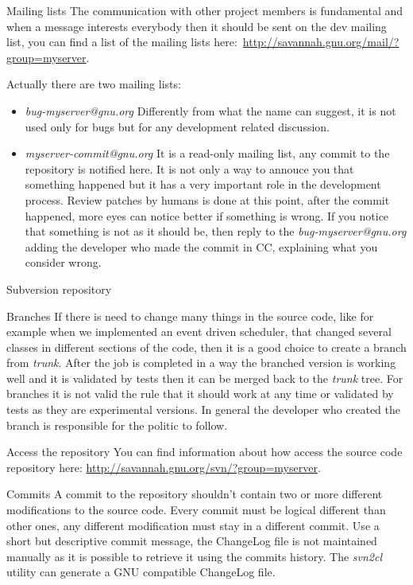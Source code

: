 \documentclass[12pt]{article}
\begin{document}
\begin{section}{Mailing lists}\label{section:ml}
The communication with other project members is fundamental and when a
message interests everybody then it should be sent on the dev mailing
list, you can find a list of the mailing lists
here:~\url{http://savannah.gnu.org/mail/?group=myserver}.

Actually there are two mailing lists:
\begin{itemize}
\item \textit{bug-myserver@gnu.org} Differently from what the name can
  suggest, it is not used only for bugs but for any development
  related discussion.
\item \textit{myserver-commit@gnu.org} It is a read-only mailing list,
  any commit to the repository is notified here.  It is not only a way
  to annouce you that something happened but it has a very important
  role in the development process.  Review patches by humans is done
  at this point, after the commit happened, more eyes can notice
  better if something is wrong.  If you notice that something is not
  as it should be, then reply to the \textit{bug-myserver@gnu.org}
  adding the developer who made the commit in CC, explaining what you
  consider wrong.
\end{itemize}
\end{section}

\begin{section}{Subversion repository}\label{section:svn}
\begin{subsection}{Branches}
If there is need to change many things in the source code, like for
example when we implemented an event driven scheduler, that changed
several classes in different sections of the code, then it is a good
choice to create a branch from \textit{trunk}.
After the job is completed in a way the branched version is working
well and it is validated by tests then it can be merged back to the
\textit{trunk} tree.
For branches it is not valid the rule that it should work at any time
or validated by tests as they are experimental versions.  In general
the developer who created the branch is responsible for the politic to
follow.
\end{subsection}

\begin{subsection}{Access the repository}
You can find information about how access the source code repository here:
\url{http://savannah.gnu.org/svn/?group=myserver}.
\end{subsection}

\begin{subsection}{Commits}
A commit to the repository shouldn't contain two or more different
modifications to the source code.
Every commit must be logical different than other ones, any different
modification must stay in a different commit.
Use a short but descriptive commit message, the ChangeLog file is not
maintained manually as it is possible to retrieve it using the commits
history.  The \textit{svn2cl} utility can generate a GNU compatible
ChangeLog file.
\end{subsection}
\end{section}
\end{document}
